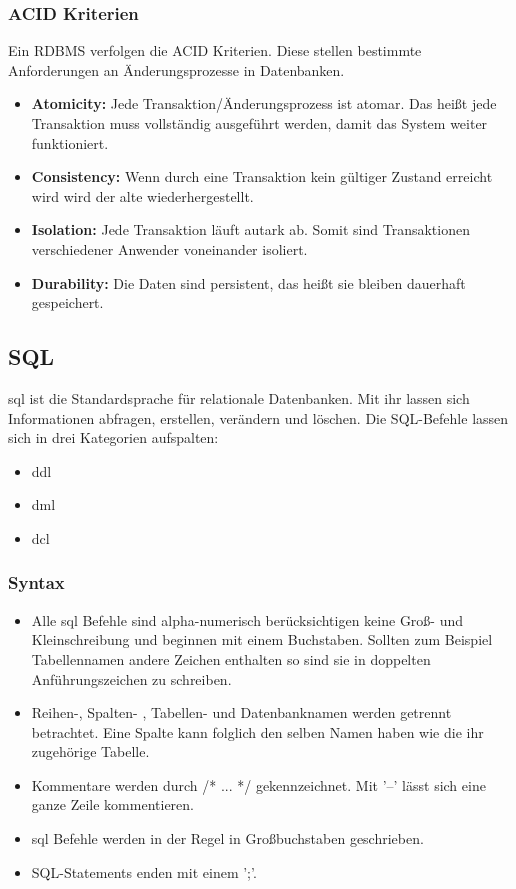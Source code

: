 \documentclass[12pt, a4paper, twoside]{article}
\begin{document}
		\subsubsection{ACID Kriterien}
	Ein \ac{RDBMS} verfolgen die ACID Kriterien. Diese stellen bestimmte Anforderungen an Änderungsprozesse in Datenbanken.
	
	\begin{itemize}
		\item \textbf{Atomicity:} Jede Transaktion/Änderungsprozess ist atomar. Das heißt jede Transaktion muss vollständig ausgeführt werden, damit das System weiter funktioniert.
		\item \textbf{Consistency:} Wenn durch eine Transaktion kein gültiger Zustand erreicht wird wird der alte wiederhergestellt. 
		\item \textbf{Isolation:} Jede Transaktion läuft autark ab. Somit sind Transaktionen verschiedener Anwender voneinander isoliert.
		\item \textbf{Durability:} Die Daten sind persistent, das heißt sie bleiben dauerhaft gespeichert.
	\end{itemize}
	\cite{acid-bigdata} \cite{ali2019comparison}
	
	
	\subsection{SQL}
		\ac{sql} ist die Standardsprache für relationale Datenbanken. Mit ihr lassen  sich Informationen abfragen, erstellen, verändern und löschen. Die SQL-Befehle lassen sich in drei Kategorien aufspalten:
		\begin{itemize}
			\item  \ac{ddl}
			\item \ac{dml}
			\item \ac{dcl}
		\end{itemize}
	
		\subsubsection{Syntax}
		\begin{itemize}
			\item  Alle \ac{sql} Befehle sind alpha-numerisch berücksichtigen keine Groß- und Kleinschreibung und beginnen mit einem Buchstaben. Sollten zum Beispiel Tabellennamen andere Zeichen enthalten so sind sie in doppelten Anführungszeichen zu schreiben.
			\item Reihen-, Spalten- , Tabellen-  und Datenbanknamen werden getrennt betrachtet. Eine Spalte kann folglich den selben Namen haben wie die ihr zugehörige Tabelle.
			\item Kommentare werden durch /* ... */ gekennzeichnet. Mit '--' lässt sich eine ganze Zeile kommentieren.
			\item \ac{sql} Befehle werden in der Regel in Großbuchstaben geschrieben.
			\item SQL-Statements enden mit einem ';'.
		\end{itemize}
	
\end{document}
